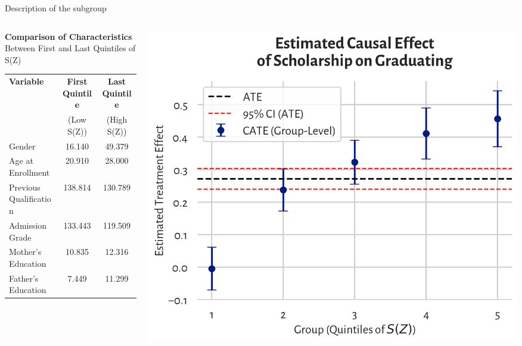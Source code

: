 \documentclass[aspectratio=169]{beamer}
\begin{document}
\begin{frame}{Description of the subgroup}
\vspace{10pt}
\begin{columns}
\begin{column}{0.5\textwidth}
\small
    \textbf{Comparison of Characteristics} \\ Between First and Last Quintiles of S(Z) \\
\vspace{5pt}
    \begin{tabular}{l c c}
        \hline
    \textbf{Variable} & \textbf{First Quintile} & \textbf{Last Quintile} \\ & (Low S(Z)) & (High S(Z)) \\
        \hline
        Gender & 16.140 & 49.379 \\
        Age at Enrollment & 20.910 & 28.000 \\
        Previous Qualification & 138.814 & 130.789 \\
        Admission Grade & 133.443 & 119.509 \\
        Mother’s Education & 10.835 & 12.316 \\
        Father’s Education & 7.449 & 11.299 \\
        \hline
    \end{tabular}
\end{column}
\begin{column}{0.4\textwidth}
\hspace*{-0.1cm}
	\includegraphics[width=1.1\linewidth]{Tex_Pictures/HE_quintile_graduating.png}
\end{column}
\end{columns}



\end{frame}
\end{document}
